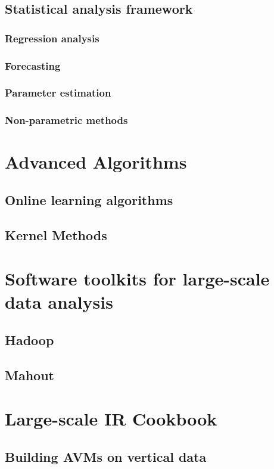 \documentclass[]{book}    %
\begin{document}
\section{Statistical analysis framework}
\subsection{Regression analysis}
\subsection{Forecasting}
\subsection{Parameter estimation}
\subsection{Non-parametric methods}

\chapter{Advanced Algorithms}
\section{Online learning algorithms}
\section{Kernel Methods}

\chapter{Software toolkits for large-scale data analysis}
\section{Hadoop}
\section{Mahout}

\chapter{Large-scale IR Cookbook}
\section{Building AVMs on vertical data}
\end{document}
